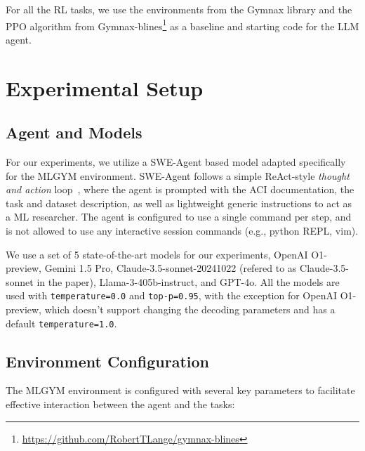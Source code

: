 \documentclass[]{fairmeta}
\newcommand{\dn}[1]{\colorbox{magenta}{\textcolor{white}{Deepak}}\textcolor{magenta}{\textbf{:#1}}}
\newcommand{\rr}[1]{\colorbox{red}{\textcolor{white}{Roberta}}\textcolor{red}{\textbf{:#1}}}
\begin{document}
For all the RL tasks, we use the environments from the Gymnax library \citep{gymnax2022github} and the PPO algorithm from Gymnax-blines\footnote{\url{https://github.com/RobertTLange/gymnax-blines}} as a baseline and starting code for the LLM agent.





\section{Experimental Setup}
\label{sec:experiment_setup}


\subsection{Agent and Models}
For our experiments, we utilize a SWE-Agent based model adapted specifically for the MLGYM environment.
%
SWE-Agent follows a simple ReAct-style \textit{thought and action} loop~\citep{yao2023react}, where the agent is prompted with the ACI documentation, the task and dataset description, as well as lightweight generic instructions to act as a ML researcher.
%
The agent is configured to use a single command per step, and is not allowed to use any interactive session commands (e.g., python REPL, vim).

We use a set of 5 state-of-the-art models for our experiments, OpenAI O1-preview, Gemini 1.5 Pro, Claude-3.5-sonnet-20241022 (refered to as Claude-3.5-sonnet in the paper), Llama-3-405b-instruct, and GPT-4o.
%
All the models are used with \texttt{temperature=0.0} and \texttt{top-p=0.95}, with the exception for OpenAI O1-preview, which doesn't support changing the decoding parameters and has a default \texttt{temperature=1.0}.

\subsection{Environment Configuration}
The MLGYM environment is configured with several key parameters to facilitate effective interaction between the agent and the tasks:
\end{document}
